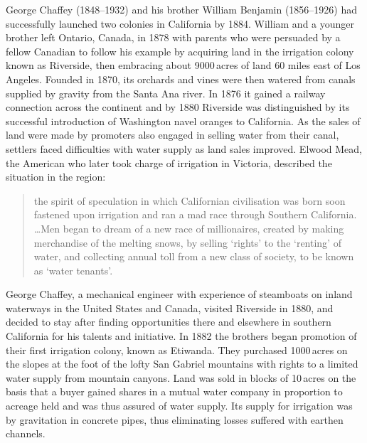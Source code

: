 George Chaffey (1848--1932) and his brother William Benjamin
(1856--1926) had successfully laun\-ch\-ed two colonies in California
by 1884.  William and a younger brother left Ontario, Canada, in 1878
with parents who were persuaded by a fellow Canadian to follow his
example by acquiring land in the irrigation colony known as Riverside,
then embracing about 9000\,acres of land 60 miles east of Los
Angeles.  Founded in 1870, its orchards and vines
were then watered from canals supplied by gravity from the Santa Ana
river.  In 1876 it gained a railway connection across the continent
and by 1880 Riverside was distinguished by its successful introduction
of Washington navel oranges to California.
As the sales of land were made by promoters also engaged in selling
water from their canal, settlers faced difficulties with water supply
as land sales improved.  Elwood Mead,  the American
who later took charge of irrigation in Victoria, described the
situation in the region:
\begin{quote}
	the spirit of speculation in which Californian civilisation
	was born soon fastened upon irrigation and ran a mad race
	through Southern California. \ldots Men began to dream of a new
	race of millionaires, created by making merchandise of the
	melting snows, by selling `rights' to the `renting' of water,
	and collecting annual toll from a new class of society, to be
	known as `water tenants'.
\end{quote}

George Chaffey,  a mechanical engineer with
experience of steamboats on inland waterways in the United States and
Canada, visited Riverside in 1880, and decided to stay after finding
opportunities there and elsewhere in southern California for his
talents and initiative.  In 1882 the brothers began promotion of their
first irrigation colony, known as
Etiwanda.  They purchased
1000\,acres on the slopes at the foot of the lofty San Gabriel
mountains with rights to a limited water supply from mountain canyons.
Land was sold in blocks of 10\,acres on the basis that a buyer gained
shares in a mutual water company in proportion to acreage held and was
thus assured of water supply.  Its supply for irrigation was by
gravitation in concrete pipes, thus eliminating losses suffered with
earthen channels.

